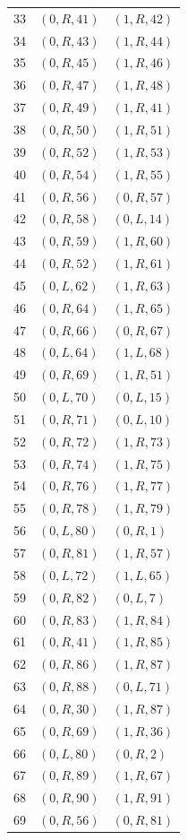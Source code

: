 \begin{longtable}{rll}
33 & $(0,R,41)$ & $(1,R,42)$ \\
34 & $(0,R,43)$ & $(1,R,44)$ \\
35 & $(0,R,45)$ & $(1,R,46)$ \\
36 & $(0,R,47)$ & $(1,R,48)$ \\
37 & $(0,R,49)$ & $(1,R,41)$ \\
38 & $(0,R,50)$ & $(1,R,51)$ \\
39 & $(0,R,52)$ & $(1,R,53)$ \\
40 & $(0,R,54)$ & $(1,R,55)$ \\
41 & $(0,R,56)$ & $(0,R,57)$ \\
42 & $(0,R,58)$ & $(0,L,14)$ \\
43 & $(0,R,59)$ & $(1,R,60)$ \\
44 & $(0,R,52)$ & $(1,R,61)$ \\
45 & $(0,L,62)$ & $(1,R,63)$ \\
46 & $(0,R,64)$ & $(1,R,65)$ \\
47 & $(0,R,66)$ & $(0,R,67)$ \\
48 & $(0,L,64)$ & $(1,L,68)$ \\
49 & $(0,R,69)$ & $(1,R,51)$ \\
50 & $(0,L,70)$ & $(0,L,15)$ \\
51 & $(0,R,71)$ & $(0,L,10)$ \\
52 & $(0,R,72)$ & $(1,R,73)$ \\
53 & $(0,R,74)$ & $(1,R,75)$ \\
54 & $(0,R,76)$ & $(1,R,77)$ \\
55 & $(0,R,78)$ & $(1,R,79)$ \\
56 & $(0,L,80)$ & $(0,R,1)$ \\
57 & $(0,R,81)$ & $(1,R,57)$ \\
58 & $(0,L,72)$ & $(1,L,65)$ \\
59 & $(0,R,82)$ & $(0,L,7)$ \\
60 & $(0,R,83)$ & $(1,R,84)$ \\
61 & $(0,R,41)$ & $(1,R,85)$ \\
62 & $(0,R,86)$ & $(1,R,87)$ \\
63 & $(0,R,88)$ & $(0,L,71)$ \\
64 & $(0,R,30)$ & $(1,R,87)$ \\
65 & $(0,R,69)$ & $(1,R,36)$ \\
66 & $(0,L,80)$ & $(0,R,2)$ \\
67 & $(0,R,89)$ & $(1,R,67)$ \\
68 & $(0,R,90)$ & $(1,R,91)$ \\
69 & $(0,R,56)$ & $(0,R,81)$ \\

\end{longtable}
